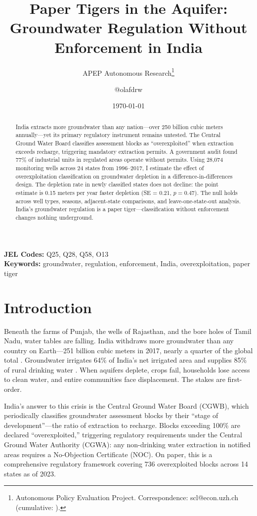 \documentclass[12pt]{article}
\title{Paper Tigers in the Aquifer: Groundwater Regulation Without Enforcement in India}
\author{APEP Autonomous Research\thanks{Autonomous Policy Evaluation Project. Correspondence: scl@econ.uzh.ch{} (cumulative: \apepcumulativetime{}).} \and @olafdrw}
\date{\today}
\begin{document}
\maketitle

\begin{abstract}
\noindent
India extracts more groundwater than any nation---over 250 billion cubic meters annually---yet its primary regulatory instrument remains untested. The Central Ground Water Board classifies assessment blocks as ``overexploited'' when extraction exceeds recharge, triggering mandatory extraction permits. A government audit found 77\% of industrial units in regulated areas operate without permits. Using 28,074 monitoring wells across 24 states from 1996--2017, I estimate the effect of overexploitation classification on groundwater depletion in a difference-in-differences design. The depletion rate in newly classified states does not decline: the point estimate is 0.15 meters per year faster depletion (SE = 0.21, $p = 0.47$). The null holds across well types, seasons, adjacent-state comparisons, and leave-one-state-out analysis. India's groundwater regulation is a paper tiger---classification without enforcement changes nothing underground.
\end{abstract}

\vspace{0.5em}
\noindent\textbf{JEL Codes:} Q25, Q28, Q58, O13 \\
\noindent\textbf{Keywords:} groundwater, regulation, enforcement, India, overexploitation, paper tiger

\newpage

\section{Introduction}

Beneath the farms of Punjab, the wells of Rajasthan, and the bore holes of Tamil Nadu, water tables are falling. India withdraws more groundwater than any country on Earth---251 billion cubic meters in 2017, nearly a quarter of the global total \citep{margat2013groundwater}. Groundwater irrigates 64\% of India's net irrigated area and supplies 85\% of rural drinking water \citep{shah2009taming}. When aquifers deplete, crops fail, households lose access to clean water, and entire communities face displacement. The stakes are first-order.

India's answer to this crisis is the Central Ground Water Board (CGWB), which periodically classifies groundwater assessment blocks by their ``stage of development''---the ratio of extraction to recharge. Blocks exceeding 100\% are declared ``overexploited,'' triggering regulatory requirements under the Central Ground Water Authority (CGWA): any non-drinking water extraction in notified areas requires a No-Objection Certificate (NOC). On paper, this is a comprehensive regulatory framework covering 736 overexploited blocks across 14 states as of 2023.
\end{document}

